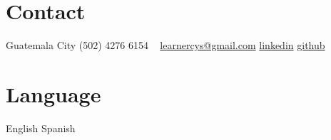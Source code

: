\documentclass[]{friggeri-cv} %
\begin{document}


\begin{aside} %
\section{Contact}
	Guatemala City
	(502) 4276 6154
	~
	\href{mailto:learnercys@gmail.com}{learnercys@gmail.com}
	\href{https://www.linkedin.com/in/carlos-hernandez-1571b187}{linkedin}
	\href{https://github.com/learnercys}{github}
\section{Language}
	English	
	Spanish
\end{aside}

\end{document}
